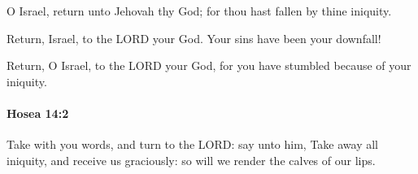 			\begin{versebox}
					\item[BHS] 
					\item[LXX] 
					\item[ASV] O Israel, return unto Jehovah thy God; for thou hast fallen by thine iniquity.
					\item[NIV] Return, Israel, to the LORD your God. Your sins have been your downfall!
					\item[NRSV] Return, O Israel, to the LORD your God, for you have stumbled because of your iniquity.
			\end{versebox}

		\paragraph{Hosea 14:2} %
			\label{HOSEA-14-2}

			Take with you words, and turn to the LORD: say unto him, Take away all iniquity, and receive us graciously: so will we render the calves of our lips.

